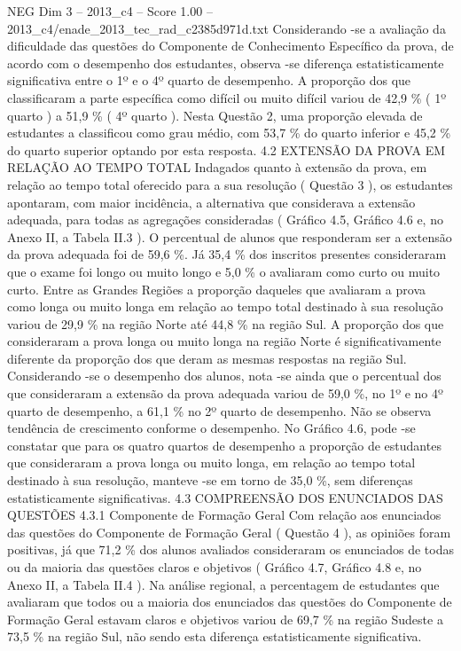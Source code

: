 \begin{textsample}{NEG Dim 3 – 2013\_c4 – Score 1.00 – 2013\_c4/enade\_2013\_tec\_rad\_c2385d971d.txt}
Considerando -se a avaliação da dificuldade das questões do Componente de Conhecimento Específico da prova, de acordo com o desempenho dos estudantes, observa -se diferença estatisticamente significativa entre o 1º e o 4º quarto de desempenho.
A proporção dos que classificaram a parte específica como difícil ou muito difícil variou de 42,9 \% ( 1º quarto ) a 51,9 \% ( 4º quarto ).
Nesta Questão 2, uma proporção elevada de estudantes a classificou como grau médio, com 53,7 \% do quarto inferior e 45,2 \% do quarto superior optando por esta resposta. 4.2 EXTENSÃO DA PROVA EM RELAÇÃO AO TEMPO TOTAL Indagados quanto à extensão da prova, em relação ao tempo total oferecido para a sua resolução ( Questão 3 ), os estudantes apontaram, com maior incidência, a alternativa que considerava a extensão adequada, para todas as agregações consideradas ( Gráfico 4.5, Gráfico 4.6 e, no Anexo II, a Tabela II.3 ).
O percentual de alunos que responderam ser a extensão da prova adequada foi de 59,6 \%.
Já 35,4 \% dos inscritos presentes consideraram que o exame foi longo ou muito longo e 5,0 \% o avaliaram como curto ou muito curto.
Entre as Grandes Regiões a proporção daqueles que avaliaram a prova como longa ou muito longa em relação ao tempo total destinado à sua resolução variou de 29,9 \% na região Norte até 44,8 \% na região Sul.
A proporção dos que consideraram a prova longa ou muito longa na região Norte é significativamente diferente da proporção dos que deram as mesmas respostas na região Sul.
Considerando -se o desempenho dos alunos, nota -se ainda que o percentual dos que consideraram a extensão da prova adequada variou de 59,0 \%, no 1º e no 4º quarto de desempenho, a 61,1 \% no 2º quarto de desempenho.
Não se observa tendência de crescimento conforme o desempenho.
No Gráfico 4.6, pode -se constatar que para os quatro quartos de desempenho a proporção de estudantes que consideraram a prova longa ou muito longa, em relação ao tempo total destinado à sua resolução, manteve -se em torno de 35,0 \%, sem diferenças estatisticamente significativas. 4.3 COMPREENSÃO DOS ENUNCIADOS DAS QUESTÕES 4.3.1 Componente de Formação Geral Com relação aos enunciados das questões do Componente de Formação Geral ( Questão 4 ), as opiniões foram positivas, já que 71,2 \% dos alunos avaliados consideraram os enunciados de todas ou da maioria das questões claros e objetivos ( Gráfico 4.7, Gráfico 4.8 e, no Anexo II, a Tabela II.4 ).
Na análise regional, a percentagem de estudantes que avaliaram que todos ou a maioria dos enunciados das questões do Componente de Formação Geral estavam claros e objetivos variou de 69,7 \% na região Sudeste a 73,5 \% na região Sul, não sendo esta diferença estatisticamente significativa.

\end{textsample}
